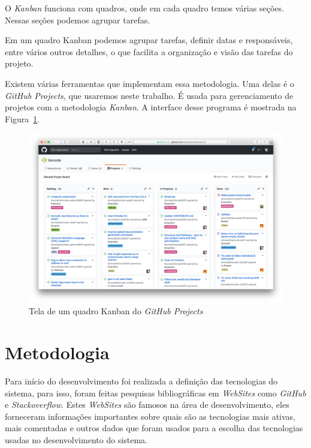 \documentclass[12pt]{article}
\begin{document}
O \textit{Kanban} funciona com quadros, onde em cada quadro temos várias seções.
Nessas seções podemos agrupar tarefas.

Em um quadro Kanban podemos agrupar tarefas, definir datas e responsáveis, entre vários outros
detalhes, o que facilita a organização e visão das tarefas do projeto.

Existem várias ferramentas que implementam essa metodologia.
Uma delas é o \emph{GitHub Projects}, que usaremos neste trabalho. É usada para gerenciamento de projetos
com a metodologia \textit{Kanban}. A interface desse programa é mostrada na Figura~\ref{fig:github-board}.

\begin{figure}[H]
  \centering
  \includegraphics[width=1\textwidth]{github/github-board.png}
  \caption{Tela de um quadro Kanban do \emph{GitHub Projects}}\label{fig:github-board}
\end{figure}



\section{Metodologia}\label{Metodologia}

Para início do desenvolvimento foi realizada a definição das tecnologias do sistema, para isso, foram feitas
pesquisas bibliográficas em \textit{WebSites} como \textit{GitHub} e \textit{Stackoverflow}. Estes \textit{WebSites}
são famosos na área de desenvolvimento, eles forneceram informações importantes sobre quais
são as tecnologias mais ativas, mais comentadas e outros dados que foram usados para a escolha das tecnologias
usadas no desenvolvimento do sistema.
\end{document}
